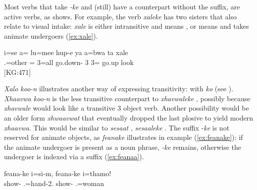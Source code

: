 Most verbs that take \textit{-ke} and (still) have a counterpart without the suffix, are active verbs, as  shows. For example, the verb \textit{xaleke}  has two sisters that also relate to visual intake: \textit{xale}  is either intransitive and means , or means  and takes animate undergoers (\ref{ex:xale}).

\ea \label{ex:xale}\gll i=se a= lu=mee hup-e ya a=bwa ta xale\\
 .=other = 3=all go.down- 3 3= go.up look\\
\glt {} {[KG:471]}
\z

\begin{sloppypar}
\textit{Xalo koo-n}  illustrates another way of expressing transitivity: with \textit{ko}  (see ). \textit{Xhaavwa koo-n}  is the less transitive counterpart to \textit{xhavwaleke} , possibly because \textit{xhavwale} would look like a transitive 3 object verb. Another possibility would be an older form \textit{xhwaavwat} that eventually dropped the last plosive to yield modern \textit{xhaavwa}. This would be similar to \textit{sesaat} , \textit{sesaaleke} . %
The suffix -\textit{ke} is not reserved for animate objects, as \textit{feanake}  illustrates in example (\ref{ex:feanake}): if the animate undergoer is present as a noun phrase, \textit{-ke} remains, otherwise the undergoer is indexed via a suffix (\ref{ex:feanaa}).%
\end{sloppypar}


\ea\label{ex:feanake}
\gll feana-ke i=si-m, feana-ke i=thamo!\\
 show- .=hand-2. show- .=woman\\
\glt {}
\z


